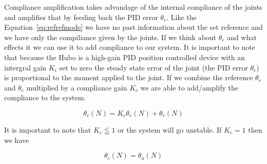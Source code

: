 Compliance amplification takes advandage of the internal compliance of the joints and amplifies that by feeding back the PID error $\theta_e$.
Like the Equation~\ref{eq:refrefmode} we have no past information about the set reference and we have only the compiliance given by the joints.
If we think about $\theta_e$ and what effects it we can use it to add compliance to our system.
It is important to note that because the Hubo is a high-gain PID position controlled device with an intergral gain $K_i$ set to zero the steady state error of the joint (the PID error $\theta_e$) is proportional to the moment applied to the joint.
If we combine the reference $\theta_r$ and $\theta_e$ multiplied by a compliance gain $K_c$ we are able to add/amplify the compliance to the system.

\begin{equation}
\theta_c(N) = K_c\theta_e(N)+\theta_r(N)
\end{equation}

It is important to note that $K_c \leqq 1$ or the system will go unstable.
If $K_c=1$ then we have

\begin{equation}
\theta_c(N) = \theta_a(N)
\end{equation}
